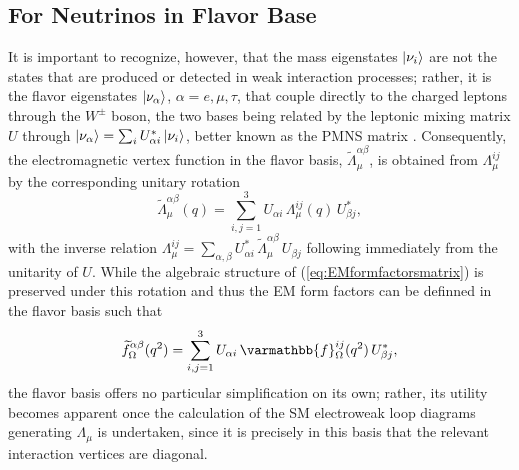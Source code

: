 \subsection{For Neutrinos in Flavor Base}
It is important to recognize, however, that the mass eigenstates $\ket{\nu_i}$ are not the states that are produced or detected in weak interaction processes; rather, it is the flavor eigenstates $\ket{\nu_\alpha}$, $\alpha = e,\mu,\tau$, that couple directly to the charged leptons through the $W^\pm$ boson, the two bases being related by the leptonic mixing matrix $U$ through $\ket{\nu_\alpha} = \sum_i U^*_{\alpha i}\ket{\nu_i}$, better known as the PMNS matrix \cite{10.1143/PTP.28.870, JWFValle_2006}. Consequently, the electromagnetic vertex function in the flavor basis, $\widetilde\Lambda^{\alpha\beta}_\mu$, is obtained from $\Lambda^{ij}_\mu$ by the corresponding unitary rotation
\begin{equation}\label{eq:flavorrotation}
\widetilde\Lambda^{\alpha\beta}_\mu(q) = \sum_{i,j=1}^{3} U_{\alpha i}\,\Lambda^{ij}_\mu(q)\,U^*_{\beta j},
\end{equation}
with the inverse relation $\Lambda^{ij}_\mu = \sum_{\alpha,\beta} U^*_{\alpha i}\,\widetilde\Lambda^{\alpha\beta}_\mu\,U_{\beta j}$ following immediately from the unitarity of $U$. While the algebraic structure of (\ref{eq:EMformfactorsmatrix}) is preserved under this rotation and thus the EM form factors can be definned in the flavor basis such that
\begin{equation}\label{eq:flavorrotation}
\widetilde f^{\alpha\beta}_\Omega(q^2) = \sum_{i,j=1}^{3} U_{\alpha i}\,\varmathbb{f}^{ij}_\Omega(q^2)\,U^*_{\beta j},
\end{equation}
the flavor basis offers no particular simplification on its own; rather, its utility becomes apparent once the calculation of the SM electroweak loop diagrams generating $\Lambda_\mu$ is undertaken, since it is precisely in this basis that the relevant interaction vertices are diagonal.

